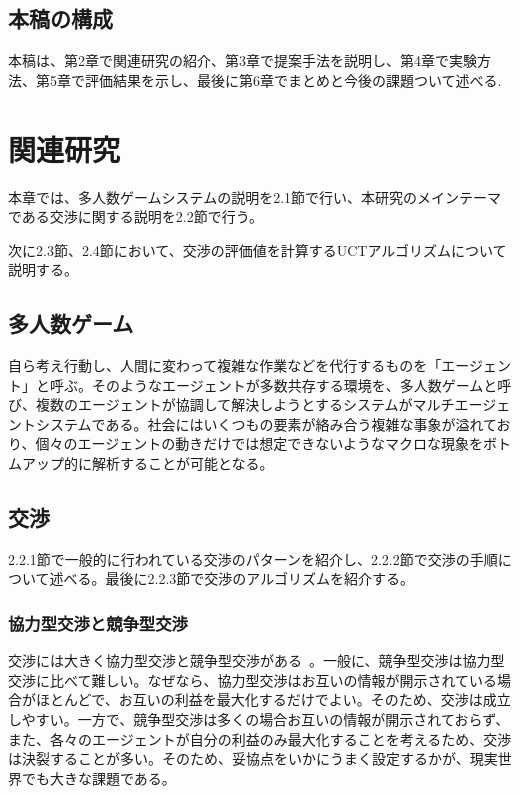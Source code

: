 \documentclass[a4, 10pt,dvipdfmx]{jsarticle}
\begin{document}
\subsection{本稿の構成}

本稿は、第2章で関連研究の紹介、第3章で提案手法を説明し、第4章で実験方法、第5章で評価結果を示し、最後に第6章でまとめと今後の課題ついて述べる.


\section{関連研究}

本章では、多人数ゲームシステムの説明を2.1節で行い、本研究のメインテーマである交渉に関する説明を2.2節で行う。

次に2.3節、2.4節において、交渉の評価値を計算するUCTアルゴリズムについて説明する。

\subsection{多人数ゲーム}
自ら考え行動し、人間に変わって複雑な作業などを代行するものを「エージェント」と呼ぶ。そのようなエージェントが多数共存する環境を、多人数ゲームと呼び、複数のエージェントが協調して解決しようとするシステムがマルチエージェントシステムである。社会にはいくつもの要素が絡み合う複雑な事象が溢れており、個々のエージェントの動きだけでは想定できないようなマクロな現象をボトムアップ的に解析することが可能となる。

\subsection{交渉}
2.2.1節で一般的に行われている交渉のパターンを紹介し、2.2.2節で交渉の手順について述べる。最後に2.2.3節で交渉のアルゴリズムを紹介する。

\subsubsection{協力型交渉と競争型交渉}
交渉には大きく協力型交渉と競争型交渉がある~\cite{anguix2013complex}。一般に、競争型交渉は協力型交渉に比べて難しい。なぜなら、協力型交渉はお互いの情報が開示されている場合がほとんどで、お互いの利益を最大化するだけでよい。そのため、交渉は成立しやすい。一方で、競争型交渉は多くの場合お互いの情報が開示されておらず、また、各々のエージェントが自分の利益のみ最大化することを考えるため、交渉は決裂することが多い。そのため、妥協点をいかにうまく設定するかが、現実世界でも大きな課題である。
\end{document}
